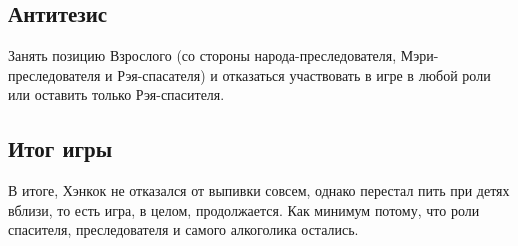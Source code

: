 \subsection*{Антитезис}

Занять позицию Взрослого (со стороны народа-преследователя, Мэри-преследователя и Рэя-спасателя) и отказаться участвовать в игре в любой роли или оставить только Рэя-спасителя. 

\subsection*{Итог игры}

В итоге, Хэнкок не отказался от выпивки совсем, однако перестал пить при детях вблизи, то есть игра, в целом, продолжается. Как минимум потому, что роли спасителя, преследователя и самого алкоголика остались. 
